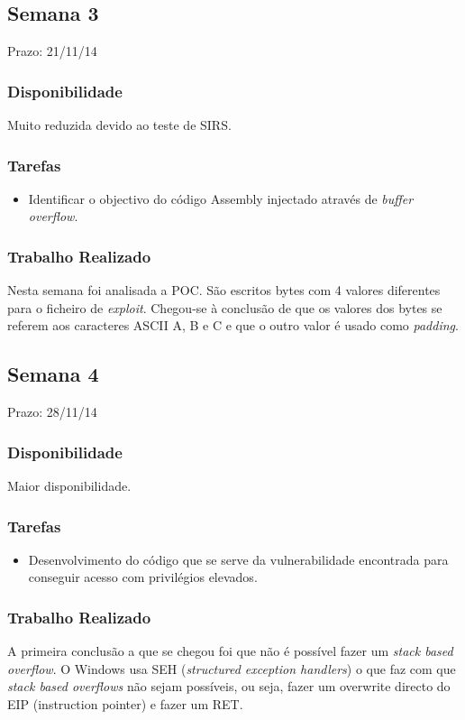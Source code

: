 \documentclass[a4paper]{article}
\begin{document}
\subsection{Semana 3}
Prazo: 21/11/14
\subsubsection{Disponibilidade}
Muito reduzida devido ao teste de SIRS.

\subsubsection{Tarefas}
\begin{itemize}
	\item Identificar o objectivo do código Assembly injectado através de \textit{buffer overflow}.
\end{itemize}

\subsubsection{Trabalho Realizado}

Nesta semana foi analisada a POC. São escritos bytes com 4 valores diferentes para o ficheiro de \textit{exploit}. Chegou-se à conclusão de que os valores dos bytes se referem aos caracteres ASCII A, B e C e que o outro valor é usado como \textit{padding}.

\subsection{Semana 4}
Prazo: 28/11/14
\subsubsection{Disponibilidade}
Maior disponibilidade.
\subsubsection{Tarefas}
\begin{itemize}
	\item Desenvolvimento do código que se serve da vulnerabilidade encontrada para conseguir acesso com privilégios elevados.
\end{itemize}

\subsubsection{Trabalho Realizado}
A primeira conclusão a que se chegou foi que não é possível fazer um \textit{stack based overflow}. O Windows usa SEH (\textit{structured exception handlers}) o que faz com que \textit{stack based overflows} não sejam possíveis, ou seja, fazer um overwrite directo do EIP (instruction pointer) e fazer um RET.
\end{document}
